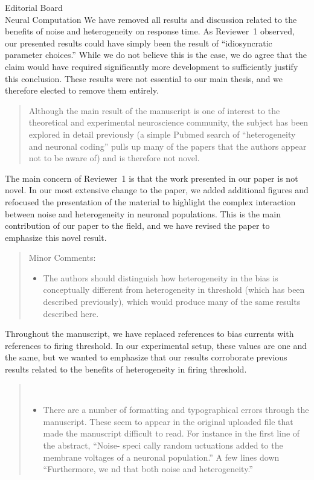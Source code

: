 \documentclass[]{letter}
\begin{document}
\begin{letter}{Editorial Board\\Neural Computation}
We have removed all results and discussion related to the benefits of noise and heterogeneity on response time. As Reviewer~1 observed, our presented results could have simply been the result of ``idiosyncratic parameter choices.'' While we do not believe this is the case, we do agree that the claim would have required significantly more development to sufficiently justify this conclusion. These results were not essential to our main thesis, and we therefore elected to remove them entirely.

\begin{quotation}
  Although the main result of the manuscript is one of interest to the theoretical and experimental neuroscience community, the subject has been explored in detail previously (a simple Pubmed search of ``heterogeneity and neuronal coding'' pulls up many of the papers that the authors appear not to be aware of) and is therefore not novel.
\end{quotation}

The main concern of Reviewer~1 is that the work presented in our paper is not novel. In our most extensive change to the paper, we added additional figures and refocused the presentation of the material to highlight the complex interaction between noise and heterogeneity in neuronal populations. This is the main contribution of our paper to the field, and we have revised the paper to emphasize this novel result.

\begin{quotation}
  Minor Comments:
  \begin{itemize}
  \item The authors should distinguish how heterogeneity in the bias is conceptually different from heterogeneity in threshold (which has been described previously), which would produce many of the same results described here.
  \end{itemize}
\end{quotation}

Throughout the manuscript, we have replaced references to bias currents with references to firing threshold. In our experimental setup, these values are one and the same, but we wanted to emphasize that our results corroborate previous results related to the benefits of heterogeneity in firing threshold.

\begin{quotation}
  \ \vspace{-1.3em}
  \begin{itemize}
  \item There are a number of formatting and typographical errors through the manuscript. These seem to appear in the original uploaded file that made the manuscript difficult to read. For instance in the first line of the abstract, ``Noise- speci cally random uctuations added to the membrane voltages of a neuronal population.'' A few lines down ``Furthermore, we nd that both noise and heterogeneity.''
  \end{itemize}
\end{quotation}


\end{letter}
\end{document}
